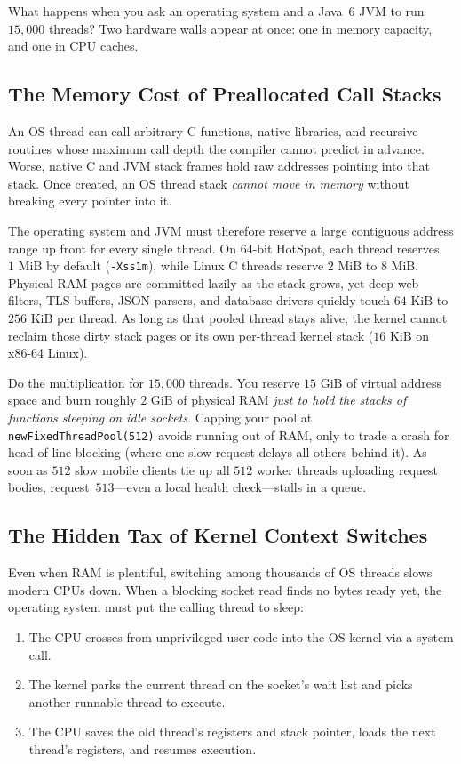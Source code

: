 What happens when you ask an operating system and a Java~6 JVM to run $15{,}000$ threads? Two hardware walls appear at once: one in memory capacity, and one in CPU caches.

\subsection{The Memory Cost of Preallocated Call Stacks}

An OS thread can call arbitrary C functions, native libraries, and recursive routines whose maximum call depth the compiler cannot predict in advance. Worse, native C and JVM stack frames hold raw addresses pointing into that stack. Once created, an OS thread stack \emph{cannot move in memory} without breaking every pointer into it.

The operating system and JVM must therefore reserve a large contiguous address range up front for every single thread. On 64-bit HotSpot, each thread reserves $1\text{ MiB}$ by default (\texttt{-Xss1m}), while Linux C threads reserve $2\text{ MiB}$ to $8\text{ MiB}$. Physical RAM pages are committed lazily as the stack grows, yet deep web filters, TLS buffers, JSON parsers, and database drivers quickly touch $64\text{ KiB}$ to $256\text{ KiB}$ per thread. As long as that pooled thread stays alive, the kernel cannot reclaim those dirty stack pages or its own per-thread kernel stack ($16\text{ KiB}$ on x86-64 Linux).

Do the multiplication for $15{,}000$ threads. You reserve $15\text{ GiB}$ of virtual address space and burn roughly $2\text{ GiB}$ of physical RAM \emph{just to hold the stacks of functions sleeping on idle sockets}. Capping your pool at \texttt{newFixedThreadPool(512)} avoids running out of RAM, only to trade a crash for head-of-line blocking (where one slow request delays all others behind it). As soon as $512$ slow mobile clients tie up all $512$ worker threads uploading request bodies, request~$513$---even a local health check---stalls in a queue.

\subsection{The Hidden Tax of Kernel Context Switches}

Even when RAM is plentiful, switching among thousands of OS threads slows modern CPUs down. When a blocking socket read finds no bytes ready yet, the operating system must put the calling thread to sleep:
\begin{enumerate}
  \item The CPU crosses from unprivileged user code into the OS kernel via a system call.
  \item The kernel parks the current thread on the socket's wait list and picks another runnable thread to execute.
  \item The CPU saves the old thread's registers and stack pointer, loads the next thread's registers, and resumes execution.
\end{enumerate}

